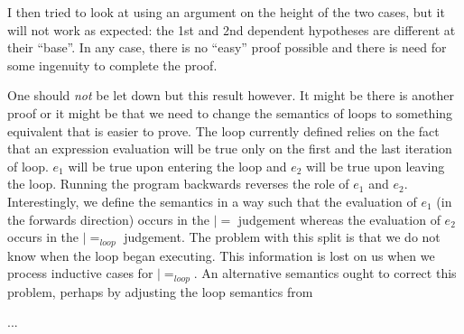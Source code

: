 I then tried to look at using an argument on the height of the two
cases, but it will not work as expected: the 1st and 2nd dependent
hypotheses are different at their ``base''. In any case, there is no
``easy'' proof possible and there is need for some ingenuity to
complete the proof.

One should \emph{not} be let down but this result however. It might be
there is another proof or it might be that we need to change the
semantics of loops to something equivalent that is easier to
prove. The loop currently defined relies on the fact that an
expression evaluation will be true only on the first and the last
iteration of loop. $e_1$ will be true upon entering the loop and $e_2$
will be true upon leaving the loop. Running the program backwards
reverses the role of $e_1$ and $e_2$. Interestingly, we define the
semantics in a way such that the evaluation of $e_1$ (in the forwards
direction) occurs in the $|=$ judgement whereas the evaluation of
$e_2$ occurs in the $|=_{loop}$ judgement. The problem with this split
is that we do not know when the loop began executing. This information
is lost on us when we process inductive cases for $|=_{loop}$. An
alternative semantics ought to correct this problem, perhaps by
adjusting the loop semantics from \cite{yokoyama.gluck:reversible}

...

